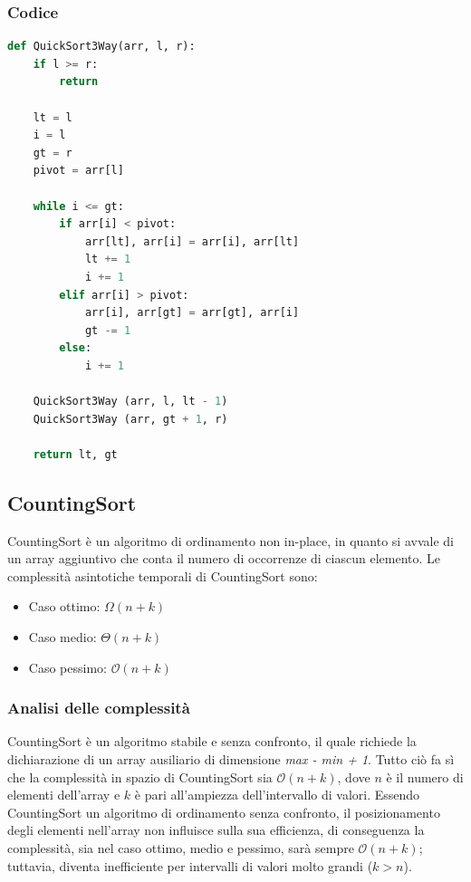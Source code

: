 \documentclass[a4paper, 11pt]{article}
\begin{document}
\subsubsection{Codice}
\begin{lstlisting}[style=mycodestyle, language=Python]
    def QuickSort3Way(arr, l, r):
    if l >= r:
        return

    lt = l
    i = l
    gt = r
    pivot = arr[l]

    while i <= gt:
        if arr[i] < pivot:
            arr[lt], arr[i] = arr[i], arr[lt]
            lt += 1
            i += 1
        elif arr[i] > pivot:
            arr[i], arr[gt] = arr[gt], arr[i]
            gt -= 1
        else:
            i += 1

    QuickSort3Way (arr, l, lt - 1)
    QuickSort3Way (arr, gt + 1, r)

    return lt, gt
\end{lstlisting}

\subsection{CountingSort}
CountingSort è un algoritmo di ordinamento non in-place, in quanto si avvale di un array aggiuntivo che conta il numero di occorrenze di ciascun elemento.\bigbreak
Le complessità asintotiche temporali di CountingSort sono:
\begin{itemize}
    \item Caso ottimo: $\Omega(n + k)$
    \item Caso medio: $\Theta(n + k)$
    \item Caso pessimo: $\mathcal{O}(n + k)$
\end{itemize}

\subsubsection{Analisi delle complessità}
CountingSort è un algoritmo stabile e senza confronto, il quale richiede la dichiarazione di un array ausiliario di dimensione \textit{max - min + 1}. Tutto ciò fa sì che la complessità in spazio di CountingSort sia $\mathcal{O}(n + k)$, dove $n$ è il numero di elementi dell'array e $k$ è pari all'ampiezza dell'intervallo di valori.\bigbreak
Essendo CountingSort un algoritmo di ordinamento senza confronto, il posizionamento degli elementi nell'array non influisce sulla sua efficienza, di conseguenza la complessità, sia nel caso ottimo, medio e pessimo, sarà sempre $\mathcal{O}(n + k)$; tuttavia, diventa inefficiente per intervalli di valori molto grandi ($k > n$). 
\end{document}
